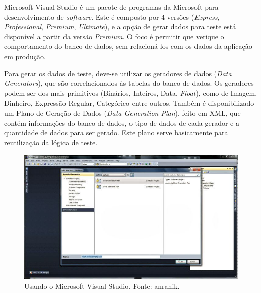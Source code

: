 \documentclass[
	12pt,				%
	openright,			%
	twoside,			%
	a4paper,			%
	english,			%
	brazil				%
	]{abntex2}
\begin{document}
		Microsoft Visual Studio \cite{VSDataGenerator} é um pacote de programas da Microsoft para desenvolvimento de \emph{software}. 
		Este é composto por 4 versões (\emph{Express}, \emph{Professional}, \emph{Premium}, \emph{Ultimate}), e a opção de gerar dados para teste está disponível a partir da versão \emph{Premium}.
		O foco é permitir que verique o comportamento do banco de dados, sem relacioná-los com os dados da aplicação em produção.
		\par
		Para gerar os dados de teste, deve-se utilizar os geradores de dados (\emph{Data Generators}), que são correlacionados às tabelas do banco de dados.
			Os geradores podem ser dos mais primitivos (Binários, Inteiros, Data, \emph{Float}), como de Imagem, Dinheiro, Expressão Regular, Categórico entre outros.
		Também é disponibilizado um Plano de Geração de Dados (\emph{Data Generation Plan}), feito em XML, que contém informações do banco de dados, o tipo de dados de cada gerador e a quantidade de dados para ser gerado. 
		Este plano serve basicamente para reutilização da lógica de teste.
		\begin{figure}[h]
			\centering
			\includegraphics[width=\linewidth]{./figures/TrabalhosRelacionados/Visual-Studio.jpg}
			\caption{Usando o Microsoft Visual Studio. Fonte: anranik.}
			\label{fig:VSDG}
		\end{figure}
\end{document}
